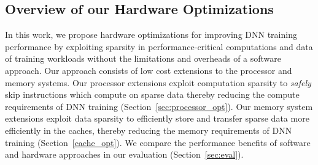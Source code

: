 \subsection{Overview of our Hardware Optimizations}
\label{subsec:overview}
In this work, we propose hardware optimizations for improving DNN training performance by exploiting sparsity in performance-critical computations and data of training workloads without the limitations and overheads of a software approach.   Our approach consists of low cost extensions to the processor and memory systems.  Our processor extensions exploit computation sparsity to \emph{safely} skip instructions which compute on sparse data thereby reducing the compute requirements of  DNN training (Section~\ref{sec:processor_opt}).   Our memory system extensions  exploit data sparsity to efficiently store and transfer sparse data more efficiently in the caches, thereby reducing the memory requirements of DNN training (Section~\ref{cache_opt}).   We compare the performance benefits of software and hardware approaches in our evaluation (Section~\ref{sec:eval}). 

 
